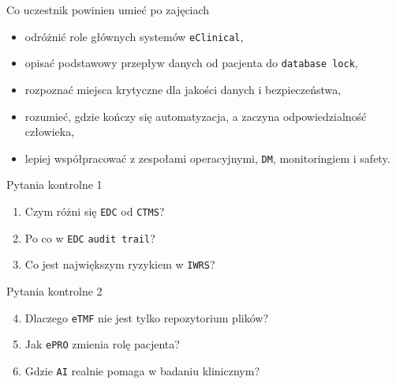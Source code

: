 \begin{frame}{Co uczestnik powinien umieć po zajęciach}
  \begin{itemize}
    \item odróżnić role głównych systemów \texttt{eClinical},
    \item opisać podstawowy przepływ danych od pacjenta do \texttt{database lock},
    \item rozpoznać miejsca krytyczne dla jakości danych i bezpieczeństwa,
    \item rozumieć, gdzie kończy się automatyzacja, a zaczyna odpowiedzialność człowieka,
    \item lepiej współpracować z zespołami operacyjnymi, \texttt{DM}, monitoringiem i safety.
  \end{itemize}
\end{frame}

\begin{frame}{Pytania kontrolne 1}
  \begin{enumerate}
    \item Czym różni się \texttt{EDC} od \texttt{CTMS}?
    \item Po co w \texttt{EDC} \texttt{audit trail}?
    \item Co jest największym ryzykiem w \texttt{IWRS}?
  \end{enumerate}
\end{frame}

\begin{frame}{Pytania kontrolne 2}
  \begin{enumerate}
    \setcounter{enumi}{3}
    \item Dlaczego \texttt{eTMF} nie jest tylko repozytorium plików?
    \item Jak \texttt{ePRO} zmienia rolę pacjenta?
    \item Gdzie \texttt{AI} realnie pomaga w badaniu klinicznym?
  \end{enumerate}
\end{frame}


